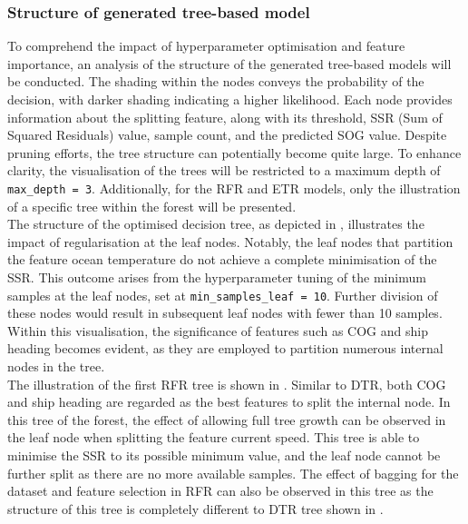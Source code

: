 \subsubsection*{Structure of generated tree-based model}


To comprehend the impact of hyperparameter optimisation and feature importance, an analysis of the structure of the generated tree-based models will be conducted. The shading within the nodes conveys the probability of the decision, with darker shading indicating a higher likelihood. Each node provides information about the splitting feature, along with its threshold, SSR (Sum of Squared Residuals) value, sample count, and the predicted SOG value. Despite pruning efforts, the tree structure can potentially become quite large. To enhance clarity, the visualisation of the trees will be restricted to a maximum depth of {\tt max\_depth = 3}. Additionally, for the RFR and ETR models, only the illustration of a specific tree within the forest will be presented.\\

The structure of the optimised decision tree, as depicted in , illustrates the impact of regularisation at the leaf nodes. Notably, the leaf nodes that partition the feature ocean temperature do not achieve a complete minimisation of the SSR. This outcome arises from the hyperparameter tuning of the minimum samples at the leaf nodes, set at {\tt min\_samples\_leaf = 10}. Further division of these nodes would result in subsequent leaf nodes with fewer than 10 samples. Within this visualisation, the significance of features such as COG and ship heading becomes evident, as they are employed to partition numerous internal nodes in the tree.\\


The illustration of the first RFR tree is shown in . Similar to DTR, both COG and ship heading are regarded as the best features to split the internal node. In this tree of the forest, the effect of allowing full tree growth can be observed in the leaf node when splitting the feature current speed. This tree is able to minimise the SSR to its possible minimum value, and the leaf node cannot be further split as there are no more available samples. The effect of bagging for the dataset and feature selection in RFR can also be observed in this tree as the structure of this tree is completely different to DTR tree shown in .\\

